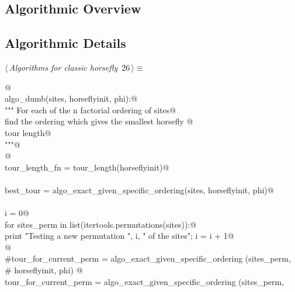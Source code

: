 \documentclass[11.5pt]{report}
\begin{document}
\subsection{Algorithmic Overview}

\subsection{Algorithmic Details}

\begin{flushleft} \small
\begin{minipage}{\linewidth}\label{scrap30}\raggedright\small
{} $\langle\,${\itshape Algorithms for classic horsefly}\nobreak\ {\footnotesize {26}}$\,\rangle\equiv$
\vspace{-1ex}
\begin{list}{}{} \item
\mbox{}\verb@   @\\
\mbox{}\verb@def algo_dumb(sites, horseflyinit, phi):@\\
\mbox{}\verb@    """ For each of the n factorial ordering of sites@\\
\mbox{}\verb@    find the ordering which gives the smallest horsefly @\\
\mbox{}\verb@    tour length@\\
\mbox{}\verb@    """@\\
\mbox{}\verb@    @\\
\mbox{}\verb@    tour_length_fn = tour_length(horseflyinit)@\\
\mbox{}\verb@@\\
\mbox{}\verb@    best_tour = algo_exact_given_specific_ordering(sites, horseflyinit, phi)@\\
\mbox{}\verb@@\\
\mbox{}\verb@    i = 0@\\
\mbox{}\verb@    for sites_perm in list(itertools.permutations(sites)):@\\
\mbox{}\verb@        print "Testing a new permutation ", i, " of the sites"; i = i + 1@\\
\mbox{}\verb@          @\\
\mbox{}\verb@        #tour_for_current_perm = algo_exact_given_specific_ordering (sites_perm, \@\\
\mbox{}\verb@        #                                                             horseflyinit, phi) @\\
\mbox{}\verb@        tour_for_current_perm = algo_exact_given_specific_ordering (sites_perm, \@\\

\end{list}
\end{minipage}
\end{flushleft}
\end{document}
